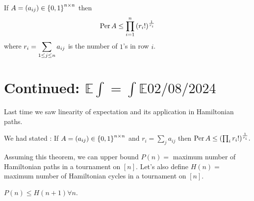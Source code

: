 \begin{thm}\label{perm}
If $A=(a_{ij})\in\left\{0,1\right\}^{n\times n}$ then $$\displaystyle\operatorname{Per} A \leq \prod_{i=1}^n \left(r_i!\right)^{\frac{1}{r_i}}$$ where $\displaystyle r_i = \sum_{1\leq j\leq n}a_{ij}$ is the number of $1$'s in row $i$.
\end{thm}


\chapter{Continued: $\mathbb E\int = \int\mathbb E$\hfill \small $02/08/2024\qquad$}

Last time we saw linearity of expectation and its application in Hamiltonian paths. 

We had stated : If $A=(a_{ij})\in \left\{0,1\right\}^{n\times n}$ and $r_i = \sum_j a_{ij}$ then $\operatorname{Per} A\leq (\prod_i r_i!)^{\frac{1}{r_i}}.$ 

Assuming this theorem, we can upper bound $P(n) = $ maximum number of Hamiltonian paths in a tournament on $[n]$. Let's also define $H(n) = $ maximum number of Hamiltonian cycles in a tournament on $[n]$.

\begin{lemma}
$P(n)\leq H(n+1)\forall n$.
\end{lemma}

